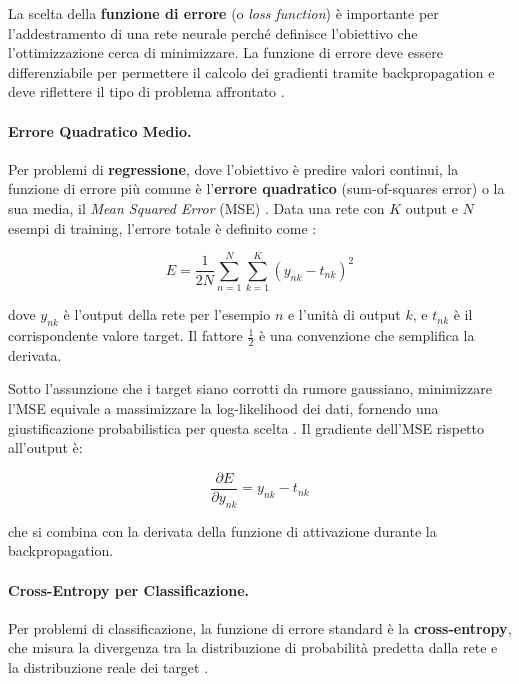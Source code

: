 La scelta della \textbf{funzione di errore} (o \textit{loss function}) è importante per l'ad\-des\-tra\-men\-to di una rete neurale perché definisce l'obiettivo che l'ottimizzazione cerca di minimizzare. La funzione di errore deve essere differenziabile per permettere il calcolo dei gradienti tramite backpropagation e deve riflettere il tipo di problema affrontato \cite{bishop2006pattern}.

\paragraph{Errore Quadratico Medio.} Per problemi di \textbf{regressione}, dove l'obiettivo è predire valori continui, la funzione di errore più comune è l'\textbf{errore quadratico} (sum-of-squares error) o la sua media, il \textit{Mean Squared Error} (MSE) \cite{hastie2009elements}. Data una rete con $K$ output e $N$ esempi di training, l'errore totale è definito come \cite{bishop2006pattern}:

\begin{equation}
E = \frac{1}{2N} \sum_{n=1}^{N} \sum_{k=1}^{K} (y_{nk} - t_{nk})^2
\label{eq:mse}
\end{equation}

dove $y_{nk}$ è l'output della rete per l'esempio $n$ e l'unità di output $k$, e $t_{nk}$ è il corrispondente valore target. Il fattore $\frac{1}{2}$ è una convenzione che semplifica la derivata.

Sotto l'assunzione che i target siano corrotti da rumore gaussiano, minimizzare l'MSE equivale a massimizzare la log-likelihood dei dati, fornendo una giustificazione probabilistica per questa scelta \cite{bishop2006pattern}. Il gradiente dell'MSE rispetto all'output è:

\begin{equation}
\frac{\partial E}{\partial y_{nk}} = y_{nk} - t_{nk}
\end{equation}

che si combina con la derivata della funzione di attivazione durante la backpropagation.

\paragraph{Cross-Entropy per Classificazione.} Per problemi di classificazione, la funzione di errore standard è la \textbf{cross-entropy}, che misura la divergenza tra la distribuzione di probabilità predetta dalla rete e la distribuzione reale dei target \cite{bishop2006pattern, goodfellow2016deep}.


